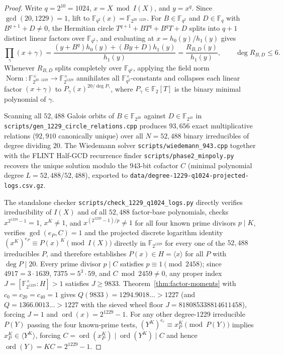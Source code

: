 \documentclass[11pt]{article}
\newcommand{\F}{\mathbb F_2}
\begin{document}
\begin{proof}
Write \(q=2^{10}=1024\), \(x=X\bmod I(X)\), and \(y=x^q\). Since
\(\gcd(20,1229)=1\), lift to \(\mathbb F_{q^2}(x)=\mathbb F_{2^{20\cdot1229}}\).
For \(B\in\mathbb F_{q^2}\) and \(D\in\mathbb F_q\) with \(B^{q+1}+D\ne0\),
the Hermitian circle \(T^{q+1}+BT^q+B^qT+D\) splits into \(q+1\) distinct
linear factors over \(\mathbb F_{q^2}\), and evaluating at \(x=h_0(y)/h_1(y)\)
gives
\[
  \prod_{\gamma}(x+\gamma)=\frac{(y+B^q)h_0(y)+(By+D)h_1(y)}{h_1(y)}
  =\frac{R_{B,D}(y)}{h_1(y)},\qquad \deg R_{B,D}\le6.
\]
Whenever \(R_{B,D}\) splits completely over \(\mathbb F_{q^2}\), applying the
field norm \(\operatorname{Norm}:\mathbb F_{2^{20\cdot1229}}^\times\to\mathbb F_{2^{1229}}^\times\)
annihilates all \(\mathbb F_{q^2}^\times\)-constants and collapses each linear
factor \((x+\gamma)\) to \(P_\gamma(x)^{20/\deg P_\gamma}\), where
\(P_\gamma\in\F[T]\) is the binary minimal polynomial of \(\gamma\).

Scanning all \(52{,}488\) Galois orbits of \(B\in\mathbb F_{2^{20}}\) against
\(D\in\mathbb F_{2^{10}}\) in \nolinkurl{scripts/gen_1229_circle_relations.cpp}
produces \(93{,}656\) exact multiplicative relations (\(92{,}910\) canonically
unique) over all \(N=52{,}488\) binary irreducibles of degree dividing \(20\).
The Wiedemann solver \nolinkurl{scripts/wiedemann_943.cpp} together with the
FLINT Half-GCD recurrence finder \nolinkurl{scripts/phase2_minpoly.py} recovers
the unique solution modulo the \(943\)-bit cofactor \(C\) (minimal polynomial
degree \(L=52{,}488/52{,}488\)), exported to
\nolinkurl{data/degree-1229-q1024-projected-logs.csv.gz}.

The standalone checker \nolinkurl{scripts/check_1229_q1024_logs.py} directly
verifies irreducibility of \(I(X)\) and of all \(52{,}488\) factor-base
polynomials, checks \(x^{2^{1229}-1}=1\), \(x^K\ne1\), and
\(x^{(2^{1229}-1)/p}\ne1\) for all four known prime divisors \(p\mid K\),
verifies \(\gcd(e_P,C)=1\) and the projected discrete logarithm identity
\((x^K)^{e_P}\equiv P(x)^K\pmod{I(X)}\) directly in \(\mathbb F_{2^{1229}}\)
for every one of the \(52{,}488\) irreducibles \(P\), and therefore establishes
\(P(x)\in H=\langle x\rangle\) for all \(P\) with \(\deg P\mid20\).
Every prime divisor \(p\mid C\) satisfies \(p\equiv1\pmod{2458}\); since
\(4917=3\cdot1639\), \(7375=5^3\cdot59\), and \(C\bmod 2459\ne0\), any proper
index \(J=[\mathbb F_{2^{1229}}^\times:H]>1\) satisfies \(J\ge 9833\).
Theorem~\ref{thm:factor-moments} with \(c_0=c_{20}=c_{40}=1\) gives
\(Q(9833)=1294.9018\ldots>1227\) (and \(Q=1366.0013\ldots>1227\) with the
sieved wheel floor \(J=818085338814611458\)), forcing \(J=1\) and
\(\operatorname{ord}(x)=2^{1229}-1\). For any other degree-\(1229\)
irreducible \(P(Y)\) passing the four known-prime tests,
\((Y^K)^{e_r}\equiv x_P^K\pmod{P(Y)}\) implies \(x_P^K\in\langle Y^K\rangle\),
forcing \(C=\operatorname{ord}(x_P^K)\mid\operatorname{ord}(Y^K)\mid C\) and
hence \(\operatorname{ord}(Y)=KC=2^{1229}-1\).
\end{proof}
\end{document}
